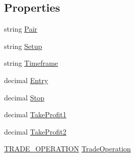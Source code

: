 \subsection*{Properties}
\begin{DoxyCompactItemize}
\item 
string \hyperlink{class_m_q_l4_c_sharp_1_1_user_defined_1_1_input_1_1_c_s_v_order_a082b6c01f6fcd6c86461c2cc2e1b82b2}{Pair}
\item 
string \hyperlink{class_m_q_l4_c_sharp_1_1_user_defined_1_1_input_1_1_c_s_v_order_a0da2c5b803db69cb595df628a49bd6a7}{Setup}
\item 
string \hyperlink{class_m_q_l4_c_sharp_1_1_user_defined_1_1_input_1_1_c_s_v_order_a610cbb8b988902129534c86428dc749c}{Timeframe}
\item 
decimal \hyperlink{class_m_q_l4_c_sharp_1_1_user_defined_1_1_input_1_1_c_s_v_order_a914e6a1a85a5c1e58bb3952664773aef}{Entry}
\item 
decimal \hyperlink{class_m_q_l4_c_sharp_1_1_user_defined_1_1_input_1_1_c_s_v_order_ae11596a92974bbb46b6c5b65a2087882}{Stop}
\item 
decimal \hyperlink{class_m_q_l4_c_sharp_1_1_user_defined_1_1_input_1_1_c_s_v_order_ace4e71fedcf4fa49f6a7abe61b27f88a}{Take\+Profit1}
\item 
decimal \hyperlink{class_m_q_l4_c_sharp_1_1_user_defined_1_1_input_1_1_c_s_v_order_a373689a4bade5e587415c43ba818629a}{Take\+Profit2}
\item 
\hyperlink{namespace_m_q_l4_c_sharp_1_1_base_1_1_enums_aa66cfebab64daf6099edf09607bbb1d9}{T\+R\+A\+D\+E\+\_\+\+O\+P\+E\+R\+A\+T\+I\+ON} \hyperlink{class_m_q_l4_c_sharp_1_1_user_defined_1_1_input_1_1_c_s_v_order_a1b429c1a7fd22cd06804e52df85c3e7f}{Trade\+Operation}
\end{DoxyCompactItemize}


